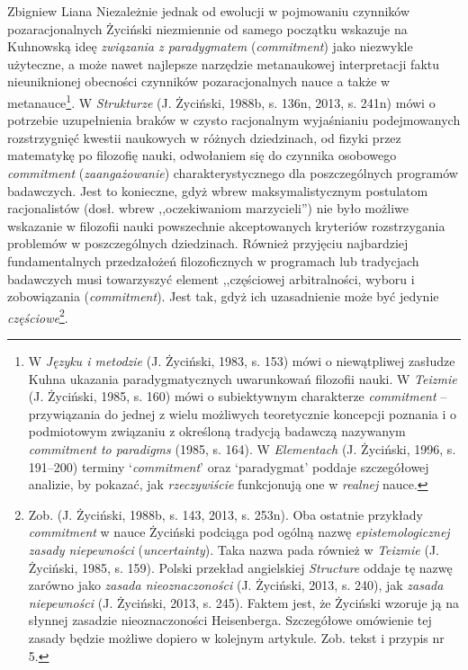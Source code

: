 \begin{artplenv}{Zbigniew Liana}
Niezależnie jednak od ewolucji w pojmowaniu czynników pozaracjonalnych Życiński niezmiennie od samego początku wskazuje
na Kuhnowską ideę \textit{związania z paradygmatem }(\textit{commitment}) jako niezwykle użyteczne, a może nawet najlepsze
narzędzie metanaukowej interpretacji faktu nieuniknionej obecności czynników pozaracjonalnych nauce a także w
metanauce\footnote{W \textit{Języku i metodzie} \label{ref:RNDYoSNyQG6OT}(J. Życiński, 1983, s. 153) mówi o niewątpliwej
	zasłudze Kuhna ukazania paradygmatycznych uwarunkowań filozofii nauki. W \textit{Teizmie} \label{ref:RNDJ9iyAcBeRp}(J.
	Życiński, 1985, s. 160) mówi o subiektywnym charakterze \textit{commitment} -- przywiązania do jednej z wielu możliwych
	teoretycznie koncepcji poznania i o podmiotowym związaniu z określoną tradycją badawczą nazywanym \textit{commitment to
		paradigms} \label{ref:RND7uoHzvi4cv}(1985, s. 164). W \textit{Elementach} \label{ref:RNDiRufhvdQjS}(J. Życiński, 1996, s.
	191–200) terminy ‘\textit{commitment}’ oraz ‘paradygmat’ poddaje szczegółowej analizie, by pokazać, jak
	\textit{rzeczywiście }funkcjonują one w \textit{realnej} nauce.}. W \textit{Strukturze }\label{ref:RNDlo3gRg9nYs}(J.
Życiński, 1988b, s. 136n, 2013, s. 241n) mówi o potrzebie uzupełnienia braków w czysto racjonalnym wyjaśnianiu
podejmowanych rozstrzygnięć kwestii naukowych w różnych dziedzinach, od fizyki przez matematykę po filozofię nauki,
odwołaniem się do czynnika osobowego \textit{commitment} (\textit{zaangażowanie}) charakterystycznego dla poszczególnych
programów badawczych. Jest to konieczne, gdyż wbrew maksymalistycznym postulatom racjonalistów (dosł. wbrew
,,oczekiwaniom marzycieli'') nie było możliwe wskazanie w filozofii nauki powszechnie akceptowanych kryteriów
rozstrzygania problemów w poszczególnych dziedzinach. Również przyjęciu najbardziej fundamentalnych przedzałożeń
filozoficznych w programach lub tradycjach badawczych musi towarzyszyć element ,,częściowej arbitralności, wyboru i
zobowiązania (\textit{commitment}). Jest tak, gdyż ich uzasadnienie może być jedynie \textit{częściowe}\footnote{Zob.
	\label{ref:RNDNqJzVjNuqB}(J. Życiński, 1988b, s. 143, 2013, s. 253n). Oba ostatnie przykłady \textit{commitment} w nauce
	Życiński podciąga pod ogólną nazwę \textit{epistemologicznej zasady niepewności }(\textit{uncertainty}). Taka nazwa pada
	również w \textit{Teizmie} \label{ref:RNDTYIhxUDXK4}(J. Życiński, 1985, s. 159). Polski przekład angielskiej
	\textit{Structure} oddaje tę nazwę zarówno jako \textit{zasada nieoznaczoności} \label{ref:RNDcZvyKiHaKS}(J. Życiński,
	2013, s. 240), jak \textit{zasada niepewności} \label{ref:RNDwSXdH0AKWY}(J. Życiński, 2013, s. 245). Faktem jest, że
	Życiński wzoruje ją na słynnej zasadzie nieoznaczoności Heisenberga. Szczegółowe omówienie tej zasady będzie możliwe
	dopiero w kolejnym artykule. Zob. tekst i przypis nr 5.}.


\end{artplenv}
